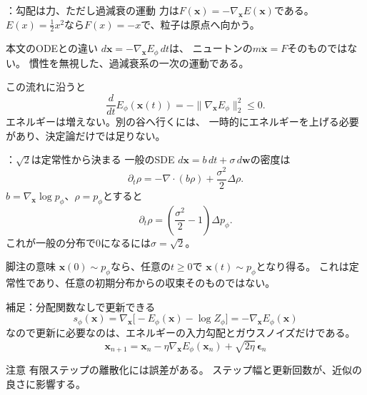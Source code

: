 \assuppl
\begin{frame}{\supplmark：勾配は力、ただし過減衰の運動}
    力は$F(\bm{x})=-\nabla_{\bm{x}}E(\bm{x})$である。
    $E(x)=\frac12 x^2$なら$F(x)=-x$で、粒子は原点へ向かう。
    \begin{exampleblock}{本文のODEとの違い}
        $d\bm{x}=-\nabla_{\bm{x}}E_\phi\,dt$は、
        ニュートンの$m\ddot{\bm{x}}=F$そのものではない。
        慣性を無視した、過減衰系の一次の運動である。
    \end{exampleblock}
    この流れに沿うと
    \[
        \frac{d}{dt}E_\phi(\bm{x}(t))
        =
        -\|\nabla_{\bm{x}}E_\phi\|_2^2
        \le 0.
\]
    エネルギーは増えない。別の谷へ行くには、
    一時的にエネルギーを上げる必要があり、決定論だけでは足りない。
\end{frame}
\assuppl
\begin{frame}{\supplmark：$\sqrt{2}$は定常性から決まる}
    一般のSDE
    $d\bm{x}=b\,dt+\sigma\,d\bm{w}$の密度は
    \[
        \partial_t\rho
        =
        -\nabla\cdot(b\rho)
        +\frac{\sigma^2}{2}\Delta\rho.
\]
    $b=\nabla_{\bm{x}}\log p_\phi$、$\rho=p_\phi$とすると
    \[
        \partial_t\rho
        =
        \left(\frac{\sigma^2}{2}-1\right)\Delta p_\phi.
\]
    これが一般の分布で$0$になるには$\sigma=\sqrt{2}$。
    \begin{exampleblock}{脚注の意味}
        $\bm{x}(0)\sim p_\phi$なら、任意の$t\ge 0$で
        $\bm{x}(t)\sim p_\phi$となり得る。
        これは定常性であり、任意の初期分布からの収束そのものではない。
    \end{exampleblock}
\end{frame}
\assuppl
\begin{frame}{補足：分配関数なしで更新できる}
    \[
        s_\phi(\bm{x})
        =
        \nabla_{\bm{x}}
        \bigl[-E_\phi(\bm{x})-\log Z_\phi\bigr]
        =
        -\nabla_{\bm{x}}E_\phi(\bm{x})
\]
    なので更新に必要なのは、エネルギーの入力勾配とガウスノイズだけである。
    \[
        \bm{x}_{n+1}
        =
        \bm{x}_n
        -\eta\nabla_{\bm{x}}E_\phi(\bm{x}_n)
        +\sqrt{2\eta}\,\bm{\epsilon}_n
        \tag{3.1.4}
\]
    \begin{exampleblock}{注意}
        有限ステップの離散化には誤差がある。
        ステップ幅と更新回数が、近似の良さに影響する。
    \end{exampleblock}
\end{frame}
